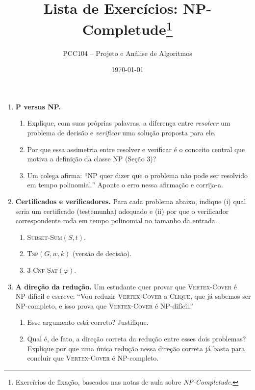 \documentclass[11pt,a4paper]{extarticle}
\title{Lista de Exercícios: NP-Completude\footnote{Exercícios de fixação, baseados nas notas de aula sobre \emph{NP-Completude}.}}
\author{PCC104 -- Projeto e Análise de Algoritmos}
\date{\today}
\begin{document}
\maketitle

\begin{enumerate}[label=\textbf{\arabic*.}]

\item \textbf{P versus NP.}
\begin{enumerate}[label=(\alph*)]
  \item Explique, com suas próprias palavras, a diferença entre \emph{resolver} um problema de decisão e \emph{verificar} uma solução proposta para ele.
  \item Por que essa assimetria entre resolver e verificar é o conceito central que motiva a definição da classe NP (Seção 3)?
  \item Um colega afirma: ``NP quer dizer que o problema não pode ser resolvido em tempo polinomial.'' Aponte o erro nessa afirmação e corrija-a.
\end{enumerate}

\item \textbf{Certificados e verificadores.} Para cada problema abaixo, indique (i) qual seria um certificado (testemunha) adequado e (ii) por que o verificador correspondente roda em tempo polinomial no tamanho da entrada.
\begin{enumerate}[label=(\alph*)]
  \item \textsc{Subset-Sum}$(S, t)$.
  \item \textsc{Tsp}$(G, w, k)$ (versão de decisão).
  \item \textsc{3-Cnf-Sat}$(\varphi)$.
\end{enumerate}

\item \textbf{A direção da redução.} Um estudante quer provar que \textsc{Vertex-Cover} é NP-difícil e escreve: ``Vou reduzir \textsc{Vertex-Cover} a \textsc{Clique}, que já sabemos ser NP-completo, e isso prova que \textsc{Vertex-Cover} é NP-difícil.''
\begin{enumerate}[label=(\alph*)]
  \item Esse argumento está correto? Justifique.
  \item Qual é, de fato, a direção correta da redução entre esses dois problemas? Explique por que uma única redução nessa direção correta já basta para concluir que \textsc{Vertex-Cover} é NP-completo.
\end{enumerate}


\end{enumerate}
\end{document}
